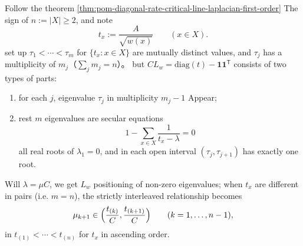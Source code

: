 \begin{theorem}\label{thm:pom-diagonal-rate-critical-spectrum-secular-interlacing}
Follow the theorem \ref{thm:pom-diagonal-rate-critical-line-laplacian-first-order} The sign of \(n:=|X|\ge 2\), and note
\[
t_x:=\frac{A}{\sqrt{w(x)}}\qquad(x\in X).
\]
set up \(\tau_1<\cdots<\tau_m\) for \(\{t_x:x\in X\}\) are mutually distinct values, and \(\tau_j\) has a multiplicity of \(m_j\)（\(\sum_j m_j=n\)）。
but \(CL_w=\mathrm{diag}(t)-\mathbf 1\mathbf 1^{\mathsf T}\) consists of two types of parts:
\begin{enumerate}
  \item for each \(j\), eigenvalue \(\tau_j\) in multiplicity \(m_j-1\) Appear;
  \item rest \(m\) eigenvalues ​​are secular equations
  \[
  1-\sum_{x\in X}\frac{1}{t_x-\lambda}=0
  \]
  all real roots of \(\lambda_1=0\), and in each open interval \((\tau_j,\tau_{j+1})\) has exactly one root.
\end{enumerate}
Will \(\lambda=\mu C\), we get \(L_w\) positioning of non-zero eigenvalues; when \(t_x\) are different in pairs (i.e. \(m=n\)), the strictly interleaved relationship becomes
\[
\mu_{k+1}\in\Bigl(\frac{t_{(k)}}{C},\frac{t_{(k+1)}}{C}\Bigr)\qquad(k=1,\dots,n-1),
\]
in \(t_{(1)}<\cdots<t_{(n)}\) for \(t_x\) in ascending order.
\end{theorem}
